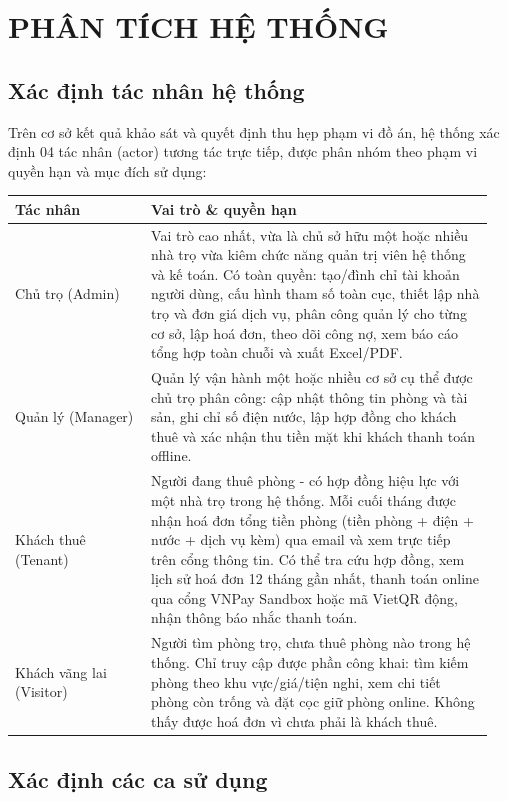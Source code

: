 \chapter{PHÂN TÍCH HỆ THỐNG}

\section{Xác định tác nhân hệ thống}

Trên cơ sở kết quả khảo sát và quyết định thu hẹp phạm vi đồ án, hệ
thống xác định 04 tác nhân (actor) tương tác trực tiếp, được phân nhóm
theo phạm vi quyền hạn và mục đích sử dụng:

\begin{longtable}[]{@{}>{\RaggedRight\arraybackslash}p{0.27\linewidth}>{\RaggedRight\arraybackslash}p{0.68\linewidth}@{}}
\toprule
\textbf{Tác nhân} & \textbf{Vai trò \& quyền hạn}\tabularnewline
\midrule
\endhead
Chủ trọ (Admin) & Vai trò cao nhất, vừa là chủ sở hữu một hoặc nhiều nhà
trọ vừa kiêm chức năng quản trị viên hệ thống và kế toán. Có toàn quyền:
tạo/đình chỉ tài khoản người dùng, cấu hình tham số toàn cục, thiết lập
nhà trọ và đơn giá dịch vụ, phân công quản lý cho từng cơ sở, lập hoá
đơn, theo dõi công nợ, xem báo cáo tổng hợp toàn chuỗi và xuất
Excel/PDF.\tabularnewline
Quản lý (Manager) & Quản lý vận hành một hoặc nhiều cơ sở cụ thể được
chủ trọ phân công: cập nhật thông tin phòng và tài sản, ghi chỉ số điện
nước, lập hợp đồng cho khách thuê và xác nhận thu tiền mặt khi khách
thanh toán offline.\tabularnewline
Khách thuê (Tenant) & Người đang thuê phòng - có hợp đồng hiệu lực với
một nhà trọ trong hệ thống. Mỗi cuối tháng được nhận hoá đơn tổng tiền
phòng (tiền phòng + điện + nước + dịch vụ kèm) qua email và xem trực
tiếp trên cổng thông tin. Có thể tra cứu hợp đồng, xem lịch sử hoá đơn
12 tháng gần nhất, thanh toán online qua cổng VNPay Sandbox hoặc mã
VietQR động, nhận thông báo nhắc thanh toán.\tabularnewline
Khách vãng lai (Visitor) & Người tìm phòng trọ, chưa thuê phòng nào
trong hệ thống. Chỉ truy cập được phần công khai: tìm kiếm phòng theo
khu vực/giá/tiện nghi, xem chi tiết phòng còn trống và đặt cọc giữ phòng
online. Không thấy được hoá đơn vì chưa phải là khách
thuê.\tabularnewline
\bottomrule
\end{longtable}

\section{Xác định các ca sử dụng}

